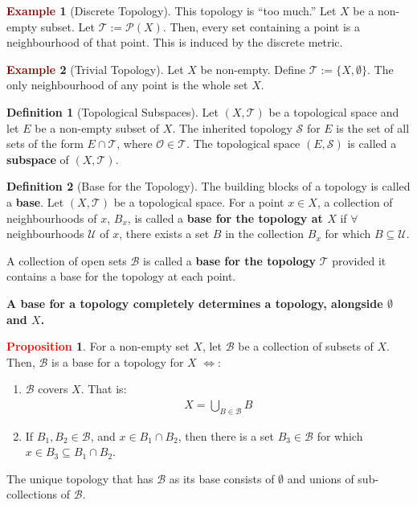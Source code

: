\documentclass[11pt]{article}
\newcommand{\open}[0]{\mathcal{O}}
\newcommand{\topo}[0]{\mathcal{T}}
\theoremstyle{definition}
\theoremstyle{definition}
\theoremstyle{definition}
\newtheorem{definition}{\textcolor{OliveGreen}{Definition}}
\newtheorem{prop}{\textcolor{red}{Proposition}}
\newtheorem{ex}{\textcolor{Maroon}{Example}}
\theoremstyle{remark}
\begin{document}
\begin{ex}[Discrete Topology] 
	This topology is ``too much.'' Let $X$ be a non-empty subset. Let $\topo := \mathcal{P}(X)$. Then, every set containing a point is a neighbourhood of that point. This is induced by the discrete metric. 
\end{ex}

\begin{ex}[Trivial Topology]
	Let $X$ be non-empty. Define $\topo := \{ X, \emptyset \}$. The only neighbourhood of any point is the whole set $X$. 	
\end{ex}

\begin{definition}[Topological Subspaces]
	Let $(X, \topo)$ be a topological space and let $E$ be a non-empty subset of $X$. The inherited topology $\mathcal{S}$ for $E$ is the set of all sets of the form $E \cap \topo$, where $\open \in \topo$. The topological space $(E, \mathcal{S})$ is called a \textbf{subspace} of $(X, \topo)$. 
\end{definition}

\begin{definition}[Base for the Topology]
	The building blocks of a topology is called a \textbf{base}. Let $(X, \topo)$ be a topological space. For a point $x \in X$, a collection of neighbourhoods of $x$, $B_x$, is called a \textbf{base for the topology at $X$} if $\forall$ neighbourhoods $\mathcal{U}$ of $x$, there exists a set $B$ in the collection $B_x$ for which $B \subseteq \mathcal{U}$. 
	
	A collection of open sets $\mathcal{B}$ is called a \textbf{base for the topology} $\topo$ provided it contains a base for the topology at each point. 
\end{definition}

\begin{center} 
\textbf{A base for a topology completely determines a topology, alongside $\emptyset$ and $X$.}
\end{center} 

\begin{prop}
	For a non-empty set $X$, let $\mathcal{B}$ be a collection of subsets of $X$. Then, $\mathcal{B}$ is a base for a topology for $X$ $\iff$: 
	\begin{enumerate}[noitemsep]
		\item $\mathcal{B}$ covers $X$. That is:
		\begin{align}
			X = \bigcup_{B \in \mathcal{B}} B
		\end{align}
		\item If $B_1, B_2 \in \mathcal{B}$, and $x \in B_1 \cap B_2$, then there is a set $B_3 \in \mathcal{B}$ for which $x \in B_3 \subseteq B_1 \cap B_2$. 
	\end{enumerate}
	The unique topology that has $\mathcal{B}$ as its base consists of $\emptyset$ and unions of sub-collections of $\mathcal{B}$. 
\end{prop}
\end{document}

